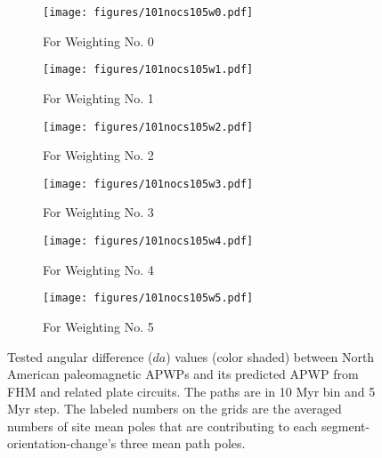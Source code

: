 \begin{figure*}
	\centering
	\begin{subfigure}{.495\textwidth}
		\texttt{[image: figures/101nocs105w0.pdf]}
		\caption{For Weighting No. 0}\label{fig-na-daw0}
	\end{subfigure}
	\vspace{.1em}
	\begin{subfigure}{.495\textwidth}
		\texttt{[image: figures/101nocs105w1.pdf]}
		\caption{For Weighting No. 1}\label{fig-na-daw1}
	\end{subfigure}
	\vspace{.1em}
	\begin{subfigure}{.495\textwidth}
		\texttt{[image: figures/101nocs105w2.pdf]}
		\caption{For Weighting No. 2}\label{fig-na-daw2}
	\end{subfigure}
	\vspace{.1em}
	\begin{subfigure}{.495\textwidth}
		\texttt{[image: figures/101nocs105w3.pdf]}
		\caption{For Weighting No. 3}\label{fig-na-daw3}
	\end{subfigure}
	\vspace{.1em}
	\begin{subfigure}{.495\textwidth}
		\texttt{[image: figures/101nocs105w4.pdf]}
		\caption{For Weighting No. 4}\label{fig-na-daw4}
	\end{subfigure}
	\vspace{.1em}
	\begin{subfigure}{.495\textwidth}
		\texttt{[image: figures/101nocs105w5.pdf]}
		\caption{For Weighting No. 5}\label{fig-na-daw5}
	\end{subfigure}
	\caption[dl of each pair of segment-oreintation-changes for North American
10/5 Myr APWPs]{Tested angular difference ($da$) values (color shaded) between
North American paleomagnetic APWPs and its predicted APWP from FHM and related
plate circuits. The paths are in 10 Myr bin and 5 Myr step. The labeled numbers
on the grids are the averaged numbers of site mean poles that are contributing
to each segment-orientation-change's three mean path poles.}\label{fig-nada}
\end{figure*}

